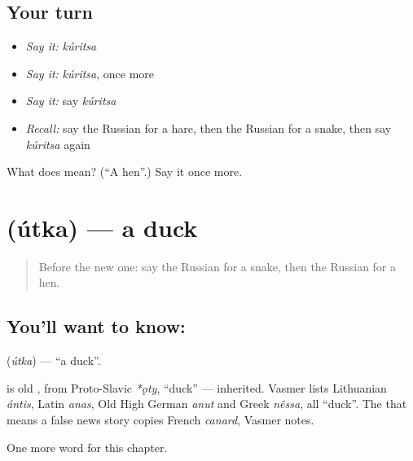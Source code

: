 \subsection*{Your turn}
\begin{itemize}
\raggedright
  \item \emph{Say it:} \emph{kúritsa}
  \item \emph{Say it:} \emph{kúritsa}, once more
  \item \emph{Say it:} say \emph{kúritsa}
  \item \emph{Recall:} say the Russian for a hare, then the Russian for a snake, then say \emph{kúritsa} again
\end{itemize}

\begin{tcolorbox}[breakable,colback=teal!4,colframe=teal!35!black,title={Before you move on}]
What does  mean? (\textquotedblleft{}A hen\textquotedblright{}.) Say it once more.
\end{tcolorbox}
\section[\texorpdfstring{\ru{утка} (útka)}{утка (útka)}]{ (útka) — a duck}

\label{lesson:RU-C62-duck}



\begin{quote}
Before the new one: say the Russian for a snake, then the Russian for a hen.
\end{quote}

\subsection*{You'll want to know: }
\textbf{} (\emph{útka}) — \textquotedblleft{}a duck\textquotedblright{}.

\begin{cousinweb}
\textbf{} is old \emph{}, from Proto-Slavic \emph{*ǫty}, \textquotedblleft{}duck\textquotedblright{} — inherited. Vasmer lists Lithuanian \emph{ántis}, Latin \emph{anas}, Old High German \emph{anut} and Greek \emph{nêssa}, all \textquotedblleft{}duck\textquotedblright{}. The \emph{} that means a false news story copies French \emph{canard}, Vasmer notes.
\end{cousinweb}

\begin{grammarlens}[title={What you've built}]
One more word for this chapter.
\end{grammarlens}

